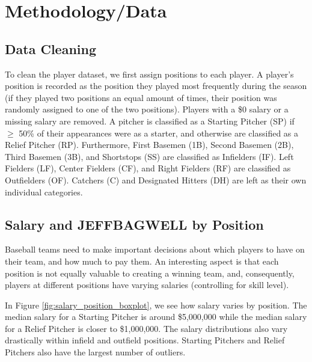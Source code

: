 \documentclass{article}
\begin{document}
\section{Methodology/Data}

\subsection{Data Cleaning}

To clean the player dataset, we first assign positions to each player. A player's position is recorded as the position they played most frequently during the season (if they played two positions an equal amount of times, their position was randomly assigned to one of the two positions). Players with a \$0 salary or a missing salary are removed. A pitcher is classified as a Starting Pitcher (SP) if $\geq$ 50\% of their appearances were as a starter, and otherwise are classified as a Relief Pitcher (RP). Furthermore, First Basemen (1B), Second Basemen (2B), Third Basemen (3B), and Shortstops (SS) are classified as Infielders (IF). Left Fielders (LF), Center Fielders (CF), and Right Fielders (RF) are classified as Outfielders (OF). Catchers (C) and Designated Hitters (DH) are left as their own individual categories. 

\subsection{Salary and JEFFBAGWELL by Position}

Baseball teams need to make important decisions about which players to have on their team, and how much to pay them. An interesting aspect is that each position is not equally valuable to creating a winning team, and, consequently, players at different positions have varying salaries (controlling for skill level). 

In Figure \ref{fig:salary_position_boxplot}, we see how salary varies by position. The median salary for a Starting Pitcher is around \$5,000,000 while the median salary for a Relief Pitcher is closer to \$1,000,000. The salary distributions also vary drastically within infield and outfield positions. Starting Pitchers and Relief Pitchers also have the largest number of outliers.
\end{document}

